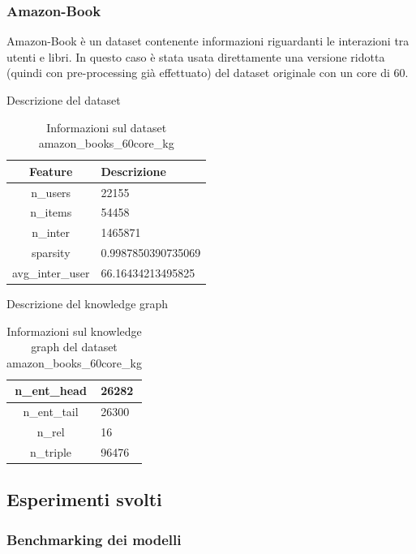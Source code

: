 \subsubsection{Amazon-Book}

\noindent Amazon-Book è un dataset contenente informazioni riguardanti le interazioni tra utenti e libri.
In questo caso è stata usata direttamente una versione ridotta (quindi con pre-processing già effettuato) del dataset originale con un core di 60.

\noindent Descrizione del dataset
\begin{table}[H]
    \centering
    \footnotesize
    \begin{tabularx}{\textwidth}{|c|X|}
        \hline
        \textbf{Feature} & \textbf{Descrizione} \\
        \hline
        n\_users & 22155 \\
        \hline
        n\_items & 54458 \\
        \hline
        n\_inter & 1465871 \\
        \hline
        sparsity & 0.9987850390735069 \\
        \hline
        avg\_inter\_user & 66.16434213495825 \\
        \hline
    \end{tabularx}
    \caption{Informazioni sul dataset amazon\_books\_60core\_kg}
    \label{tab:dataset_info}
\end{table}

\noindent Descrizione del knowledge graph
\begin{table}[H]
    \centering
    \footnotesize
    \begin{tabularx}{\textwidth}{|c|X|}
        \hline
        n\_ent\_head & 26282 \\
        \hline
        n\_ent\_tail & 26300 \\
        \hline
        n\_rel & 16 \\
        \hline
        n\_triple & 96476 \\
        \hline
    \end{tabularx}
    \caption{Informazioni sul knowledge graph del dataset amazon\_books\_60core\_kg}
    \label{tab:dataset_info}
\end{table}


\subsection{Esperimenti svolti}
\subsubsection{Benchmarking dei modelli}

